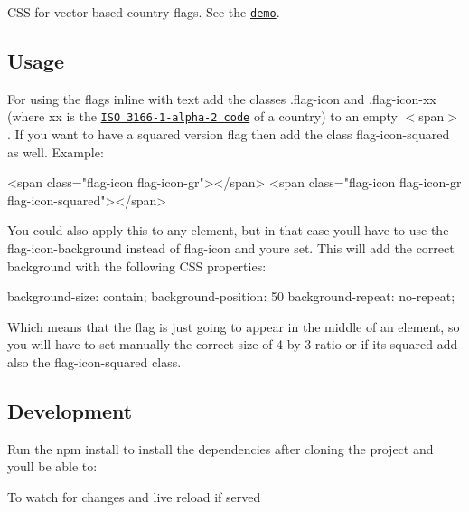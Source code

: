 \href{https://badge.fury.io/js/flag-icon-css}{\tt } \href{https://badge.fury.io/bo/flag-icon-css}{\tt }

C\+SS for vector based country flags. See the \href{http://lipis.github.io/flag-icon-css/}{\tt demo}.

\subsection*{Usage }

For using the flags inline with text add the classes {\ttfamily .flag-\/icon} and {\ttfamily .flag-\/icon-\/xx} (where {\ttfamily xx} is the \href{http://www.iso.org/iso/country_names_and_code_elements}{\tt I\+SO 3166-\/1-\/alpha-\/2 code} of a country) to an empty {\ttfamily $<$span$>$}. If you want to have a squared version flag then add the class {\ttfamily flag-\/icon-\/squared} as well. Example\+:


\begin{DoxyCode}
<span class="flag-icon flag-icon-gr"></span>
<span class="flag-icon flag-icon-gr flag-icon-squared"></span>
\end{DoxyCode}


You could also apply this to any element, but in that case you\textquotesingle{}ll have to use the {\ttfamily flag-\/icon-\/background} instead of {\ttfamily flag-\/icon} and you\textquotesingle{}re set. This will add the correct background with the following C\+SS properties\+:


\begin{DoxyCode}
background-size: contain;
background-position: 50%
background-repeat: no-repeat;
\end{DoxyCode}


Which means that the flag is just going to appear in the middle of an element, so you will have to set manually the correct size of 4 by 3 ratio or if it\textquotesingle{}s squared add also the {\ttfamily flag-\/icon-\/squared} class.

\subsection*{Development }

Run the {\ttfamily npm install} to install the dependencies after cloning the project and you\textquotesingle{}ll be able to\+:

To watch for changes and live reload if served




